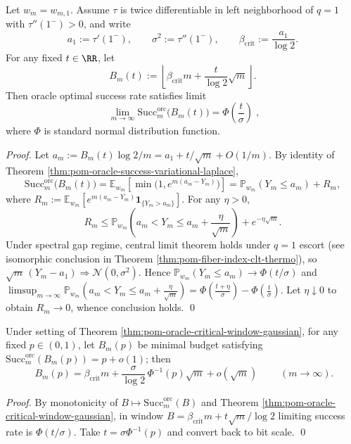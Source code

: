 \begin{theorem}[Gaussian limit at critical budget window: \texorpdfstring{$B=\beta_{\mathrm{crit}}m+O(\sqrt m)$}{B=beta m+O(sqrt m)}]\label{thm:pom-oracle-critical-window-gaussian}
Let \(w_m=w_{m,1}\).
Assume \(\tau\) is twice differentiable in left neighborhood of \(q=1\) with \(\tau''(1^-)>0\), and write
\[
a_1:=\tau'(1^-),\qquad \sigma^2:=\tau''(1^-),\qquad \beta_{\mathrm{crit}}:=\frac{a_1}{\log 2}.
\]
For any fixed \(t\in\RR\), let
\[
B_m(t):=\left\lfloor \beta_{\mathrm{crit}}m+\frac{t}{\log 2}\sqrt m\right\rfloor.
\]
Then oracle optimal success rate satisfies limit
\[
\boxed{\;
\lim_{m\to\infty}\mathrm{Succ}^{\mathrm{orc}}_m\bigl(B_m(t)\bigr)
=\Phi\!\left(\frac{t}{\sigma}\right)\;},
\]
where \(\Phi\) is standard normal distribution function.
\end{theorem}
\begin{proof}
Let \(a_m:=B_m(t)\log 2/m=a_1+t/\sqrt m+O(1/m)\).
By identity of Theorem \ref{thm:pom-oracle-success-variational-laplace},
\[
\mathrm{Succ}^{\mathrm{orc}}_m\bigl(B_m(t)\bigr)
=\mathbb{E}_{w_m}\!\left[\min\bigl(1,e^{m(a_m-Y_m)}\bigr)\right]
=\mathbb{P}_{w_m}(Y_m\le a_m)+R_m,
\]
where
\(
R_m:=\mathbb{E}_{w_m}[e^{m(a_m-Y_m)}\mathbf{1}_{\{Y_m>a_m\}}]
\).
For any \(\eta>0\),
\[
R_m\le \mathbb{P}_{w_m}\!\left(a_m<Y_m\le a_m+\frac{\eta}{\sqrt m}\right)+e^{-\eta\sqrt m}.
\]
Under spectral gap regime, central limit theorem holds under \(q=1\) escort (see isomorphic conclusion in Theorem \ref{thm:pom-fiber-index-clt-thermo}), so
\(
\sqrt m\,(Y_m-a_1)\Rightarrow \mathcal{N}(0,\sigma^2)
\).
Hence
\(
\mathbb{P}_{w_m}(Y_m\le a_m)\to \Phi(t/\sigma)
\)
and
\(
\limsup_{m\to\infty}\mathbb{P}_{w_m}\!\left(a_m<Y_m\le a_m+\frac{\eta}{\sqrt m}\right)
=\Phi\!\left(\frac{t+\eta}{\sigma}\right)-\Phi\!\left(\frac{t}{\sigma}\right)
\).
Let \(\eta\downarrow 0\) to obtain \(R_m\to 0\), whence conclusion holds. \qed
\end{proof}

\begin{corollary}\label{cor:pom-oracle-critical-window-bit-inversion}
Under setting of Theorem \ref{thm:pom-oracle-critical-window-gaussian}, for any fixed \(p\in(0,1)\), let \(B_m(p)\) be minimal budget satisfying
\(
\mathrm{Succ}^{\mathrm{orc}}_m(B_m(p))=p+o(1)
\); then
\[
\boxed{\;
B_m(p)=\beta_{\mathrm{crit}}m+\frac{\sigma}{\log 2}\,\Phi^{-1}(p)\sqrt m+o(\sqrt m)\;}
\qquad(m\to\infty).
\]
\end{corollary}
\begin{proof}
By monotonicity of \(B\mapsto \mathrm{Succ}^{\mathrm{orc}}_m(B)\) and Theorem \ref{thm:pom-oracle-critical-window-gaussian},
in window \(B=\beta_{\mathrm{crit}}m+t\sqrt m/\log2\) limiting success rate is \(\Phi(t/\sigma)\).
Take \(t=\sigma\Phi^{-1}(p)\) and convert back to bit scale. \qed
\end{proof}

